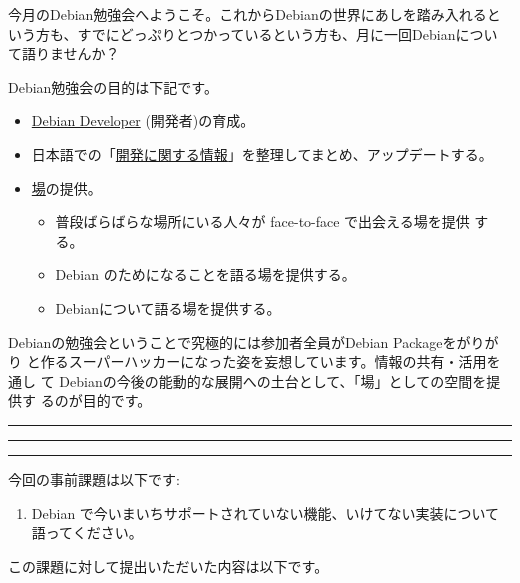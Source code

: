 \documentclass[mingoth,a4paper]{jsarticle}
\begin{document}
\begin{multicols}{2}
 

 今月のDebian勉強会へようこそ。これからDebianの世界にあしを踏み入れると
 いう方も、すでにどっぷりとつかっているという方も、月に一回Debianについ
 て語りませんか？

 Debian勉強会の目的は下記です。

 \begin{itemize}
 \item \underline{Debian Developer} (開発者)の育成。
 \item 日本語での「\underline{開発に関する情報}」を整理してまとめ、アップデートする。
 \item \underline{場}の提供。
 \begin{itemize}
  \item 普段ばらばらな場所にいる人々が face-to-face で出会える場を提供
	する。
  \item Debian のためになることを語る場を提供する。
  \item Debianについて語る場を提供する。
 \end{itemize}
 \end{itemize}		

 Debianの勉強会ということで究極的には参加者全員がDebian Packageをがりがり
 と作るスーパーハッカーになった姿を妄想しています。情報の共有・活用を通し
 て Debianの今後の能動的な展開への土台として、「場」としての空間を提供す
 るのが目的です。

\end{multicols}

\newpage

\begin{minipage}[b]{0.2\hsize}
 \colorbox{titleback}{}
\end{minipage}
\begin{minipage}[b]{0.8\hsize}
\hrule
\vspace{2mm}
\hrule
\begin{multicols}{2}
\tableofcontents
\end{multicols}
\vspace{2mm}
\hrule
\end{minipage}


今回の事前課題は以下です:
\begin{enumerate}
 \item Debian で今いまいちサポートされていない機能、いけてない実装について語ってください。
\end{enumerate}
この課題に対して提出いただいた内容は以下です。
\begin{multicols}{2}
{\small

}
\end{multicols}
\end{document}
